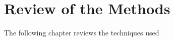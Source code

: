 \chapter{Review of the Methods}

  The following chapter reviews the techniques used 


  \begin{comment}
   Chapters  5, 7, 31, 45 y 47 
  \end{comment}
